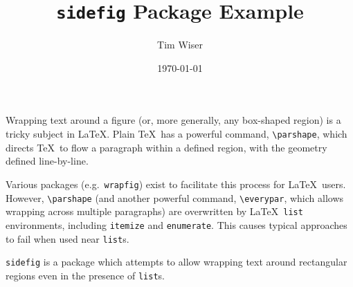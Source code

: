 \documentclass{article}
\begin{document}
	
	\title{\texttt{sidefig} Package Example}
	\author{Tim Wiser}
	\date{\today}
	
	\maketitle

	\newsavebox\samplebox
			
	
	Wrapping text around a figure (or, more generally, any box-shaped region) is a tricky subject in \LaTeX.
	Plain \TeX\ has a powerful command, \verb|\parshape|, which directs \TeX\ to flow a paragraph within a defined region, with the geometry defined line-by-line.
	
	Various packages (e.g.~\texttt{wrapfig}) exist to facilitate this process for \LaTeX\ users.
	However, \verb|\parshape| (and another powerful command, \verb|\everypar|, which allows wrapping across multiple paragraphs) are overwritten by \LaTeX\ \verb|list| environments, including \verb|itemize| and \verb|enumerate|.
	This causes typical approaches to fail when used near \verb|list|s.
	
	\texttt{sidefig} is a package which attempts to allow wrapping text around rectangular regions even in the presence of \texttt{list}s.
\end{document}
